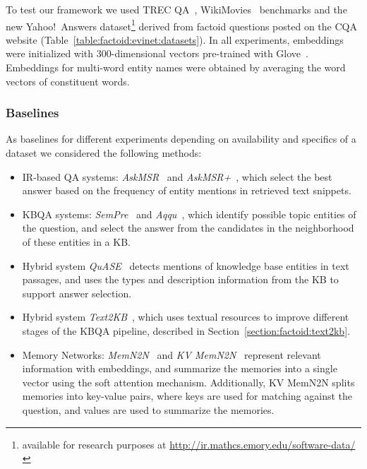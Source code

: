 To test our framework we used TREC QA~\cite{Sun:2015:ODQ:2736277.2741651}, WikiMovies~\cite{miller2016key} benchmarks and the new Yahoo!~Answers dataset\footnote{available for research purposes at \href{url}{http://ir.mathcs.emory.edu/software-data/}} derived from factoid questions posted on the CQA website (Table~\ref{table:factoid:evinet:datasets}).
In all experiments, embeddings were initialized with 300-dimensional vectors pre-trained with Glove~\cite{pennington2014glove}.
Embeddings for multi-word entity names were obtained by averaging the word vectors of constituent words.

\subsubsection{Baselines}
\label{section:factoid:evinet:eval:baselines}

As baselines for different experiments depending on availability and specifics of a dataset we considered the following methods: 
\begin{itemize}[noitemsep,nolistsep]
\item IR-based QA systems: \textit{AskMSR}~\cite{brill2002analysis} and \textit{AskMSR+}~\cite{tsai2015web}, which select the best answer based on the frequency of entity mentions in retrieved text snippets. 
\item KBQA systems: \textit{SemPre}~\cite{BerantCFL13:sempre} and \textit{Aqqu}~\cite{bastmore:cikm:2015:aquu}, which identify possible topic entities of the question, and select the answer from the candidates in the neighborhood of these entities in a KB.
\item Hybrid system \textit{QuASE}~\cite{Sun:2015:ODQ:2736277.2741651} detects mentions of knowledge base entities in text passages, and uses the types and description information from the KB to support answer selection.
\item Hybrid system \textit{Text2KB}~\cite{Savenkov:2016:KBE:2911451.2911536}, which uses textual resources to improve different stages of the KBQA pipeline, described in Section~\ref{section:factoid:text2kb}.
\item Memory Networks: \textit{MemN2N}~\cite{sukhbaatar2015end} and \textit{KV MemN2N}~\cite{miller2016key} represent relevant information with embeddings, and summarize the memories into a single vector using the soft attention mechanism. Additionally, KV MemN2N splits memories into key-value pairs, where keys are used for matching against the question, and values are used to summarize the memories.
\end{itemize}


